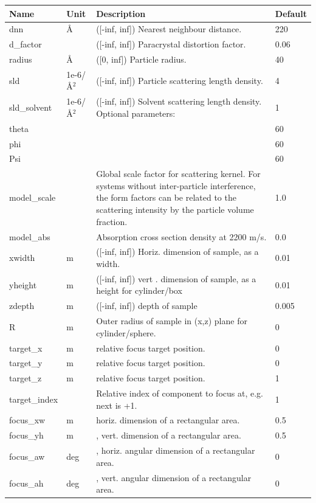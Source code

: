 \begin{longtable}{p{}p{}p{}p{}}
\toprule
\textbf{Name} & \textbf{Unit} & \textbf{Description} & \textbf{Default} \\
\midrule
\endhead
dnn & \AA{} & ([-inf, inf]) Nearest neighbour distance. & 220 \\
d\_factor &  & ([-inf, inf]) Paracrystal distortion factor. & 0.06 \\
radius & \AA{} & ([0, inf]) Particle radius. & 40 \\
sld & 1e-6/\AA{}$^{2}$ & ([-inf, inf]) Particle scattering length density. & 4 \\
sld\_solvent & 1e-6/\AA{}$^{2}$ & ([-inf, inf]) Solvent scattering length density. Optional parameters: & 1 \\
theta &  &  & 60 \\
phi &  &  & 60 \\
Psi &  &  & 60 \\
model\_scale &   & Global scale factor for scattering kernel. For systems without inter-particle interference, the form factors can be related to the scattering intensity by the particle volume fraction. & 1.0 \\
model\_abs &   & Absorption cross section density at 2200 m/s. & 0.0 \\
xwidth & m & ([-inf, inf]) Horiz. dimension of sample, as a width. & 0.01 \\
yheight & m & ([-inf, inf]) vert . dimension of sample, as a height for cylinder/box & 0.01 \\
zdepth & m & ([-inf, inf]) depth of sample & 0.005 \\
R & m & Outer radius of sample in (x,z) plane for cylinder/sphere. & 0 \\
target\_x & m & relative focus target position. & 0 \\
target\_y & m & relative focus target position. & 0 \\
target\_z & m & relative focus target position. & 1 \\
target\_index &   & Relative index of component to focus at, e.g. next is +1. & 1 \\
focus\_xw & m & horiz. dimension of a rectangular area. & 0.5 \\
focus\_yh & m & , vert. dimension of a rectangular area. & 0.5 \\
focus\_aw & deg & , horiz. angular dimension of a rectangular area. & 0 \\
focus\_ah & deg & , vert. angular dimension of a rectangular area. & 0 \\

\end{longtable}
